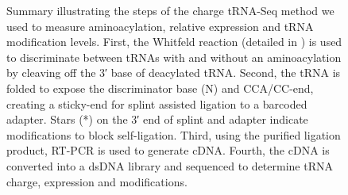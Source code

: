 \documentclass[9pt,lineno]{elife}
\begin{document}
\begin{figure}[ht!]
\centering
{}
\caption{
Summary illustrating the steps of the charge tRNA-Seq method we used to measure aminoacylation, relative expression and tRNA modification levels.
First, the Whitfeld reaction (detailed in ) is used to discriminate between tRNAs with and without an aminoacylation by cleaving off the 3′ base of deacylated tRNA.
Second, the tRNA is folded to expose the discriminator base (N) and CCA/CC-end, creating a sticky-end for splint assisted ligation to a barcoded adapter.
Stars (*) on the 3′ end of splint and adapter indicate modifications to block self-ligation.
Third, using the purified ligation product, RT-PCR is used to generate cDNA.
Fourth, the cDNA is converted into a dsDNA library and sequenced to determine tRNA charge, expression and modifications.
}
\label{fig:Fig1}


\end{figure}
\end{document}
